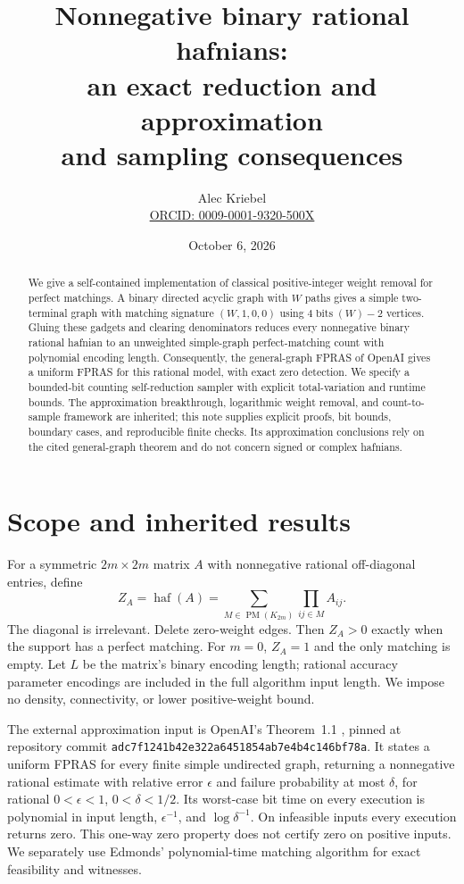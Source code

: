 \documentclass[11pt]{article}
\title{Nonnegative binary rational hafnians:\\an exact reduction and approximation\\and sampling consequences}
\author{Alec Kriebel\\\small\href{https://orcid.org/0009-0001-9320-500X}{ORCID: 0009-0001-9320-500X}}
\date{October 6, 2026}
\newcommand{\haf}{\operatorname{haf}}
\newcommand{\PM}{\operatorname{PM}}
\newcommand{\bits}{\operatorname{bits}}
\begin{document}
\maketitle
\begin{abstract}
We give a self-contained implementation of classical positive-integer weight removal for perfect matchings. A binary directed acyclic graph with $W$ paths gives a simple two-terminal graph with matching signature $(W,1,0,0)$ using $4\bits(W)-2$ vertices. Gluing these gadgets and clearing denominators reduces every nonnegative binary rational hafnian to an unweighted simple-graph perfect-matching count with polynomial encoding length. Consequently, the general-graph FPRAS of OpenAI gives a uniform FPRAS for this rational model, with exact zero detection. We specify a bounded-bit counting self-reduction sampler with explicit total-variation and runtime bounds. The approximation breakthrough, logarithmic weight removal, and count-to-sample framework are inherited; this note supplies explicit proofs, bit bounds, boundary cases, and reproducible finite checks. Its approximation conclusions rely on the cited general-graph theorem and do not concern signed or complex hafnians.
\end{abstract}

\section{Scope and inherited results}
For a symmetric $2m\times2m$ matrix $A$ with nonnegative rational off-diagonal entries, define
\[
 Z_A=\haf(A)=\sum_{M\in\PM(K_{2m})}\prod_{ij\in M}A_{ij}.
\]
The diagonal is irrelevant. Delete zero-weight edges. Then $Z_A>0$ exactly when the support has a perfect matching. For $m=0$, $Z_A=1$ and the only matching is empty. Let $L$ be the matrix's binary encoding length; rational accuracy parameter encodings are included in the full algorithm input length. We impose no density, connectivity, or lower positive-weight bound.

The external approximation input is OpenAI's Theorem~1.1 \cite{OAI}, pinned at repository commit \texttt{adc7f1241b42e322a6451854ab7e4b4c146bf78a}. It states a uniform FPRAS for every finite simple undirected graph, returning a nonnegative rational estimate with relative error $\epsilon$ and failure probability at most $\delta$, for rational $0<\epsilon<1$, $0<\delta<1/2$. Its worst-case bit time on every execution is polynomial in input length, $\epsilon^{-1}$, and $\log\delta^{-1}$. On infeasible inputs every execution returns zero. This one-way zero property does not certify zero on positive inputs. We separately use Edmonds' polynomial-time matching algorithm \cite{Edmonds} for exact feasibility and witnesses.
\end{document}
